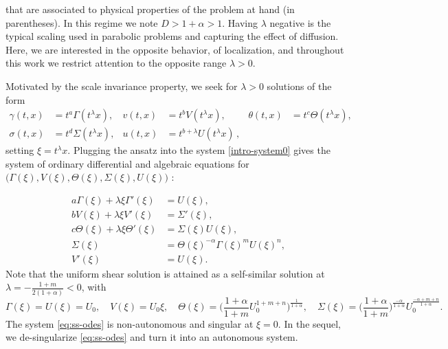 \documentclass[a4paper,11pt]{article}
\theoremstyle{remark}
\begin{document}
that are associated to physical properties of the problem at hand (in parentheses).
In this regime we note $D>1+\alpha>1$. Having $\lambda$ negative is the typical scaling used in parabolic problems and capturing the effect
of diffusion.
Here, we are interested in the opposite behavior, of localization, and throughout this work we restrict attention to the opposite range $\lambda>0$. 

Motivated by the scale invariance property, we seek for $\lambda > 0$ solutions of the form
\begin{equation}\label{eq:ORItoCAP}
\begin{aligned}
 \gamma(t,x) &= t^a\Gamma(t^\lambda x), & v(t,x) &= t^b V(t^\lambda x), &\theta(t,x) &= t^c \Theta(t^\lambda x),\\
 \sigma(t,x) &= t^d \Sigma(t^\lambda x), & u(t,x) &= t^{b+\lambda} U(t^\lambda x) \, , 
\end{aligned}
\end{equation}
setting $\xi = t^\lambda x$. Plugging the ansatz into the system \eqref{intro-system0} gives the system of ordinary differential and algebraic equations for $\big(\Gamma(\xi), V(\xi), \Theta(\xi), \Sigma(\xi), U(\xi)\big)$ :

\begin{equation}
\begin{aligned}
 a \Gamma(\xi) + \lambda \xi \Gamma'(\xi) &= U(\xi),\\
 b V(\xi) + \lambda \xi V'(\xi) &= \Sigma'(\xi),\\
 c \Theta(\xi) + \lambda \xi \Theta'(\xi)&=\Sigma(\xi) U(\xi),\\
 \Sigma(\xi) &= \Theta(\xi)^{-\alpha} \Gamma(\xi)^m U(\xi)^n,\\
 V'(\xi)&=U(\xi).
\end{aligned} \label{eq:ss-odes}
\end{equation}
Note that the uniform shear solution is attained as a self-similar solution at $\lambda = -\frac{1+m}{2(1+\alpha)}<0$, with
\begin{equation*}
 \Gamma(\xi) = U(\xi)=U_0, \quad V(\xi) = U_0\xi, \quad  \Theta(\xi) = \Big( \frac{1+\alpha}{1+m} U_0^{1+m+n}\Big)^{\frac{1}{1+\alpha}}, \quad \Sigma(\xi) = \Big(\frac{1+\alpha}{1+m}\Big)^{\frac{-\alpha}{1+\alpha}} U_0^{\frac{-\alpha+m+n}{1+\alpha}}.
\end{equation*}
The system \eqref{eq:ss-odes} is non-autonomous and  singular at $\xi=0$.
In the sequel, we de-singularize \eqref{eq:ss-odes} and turn it into an autonomous system.
\end{document}
